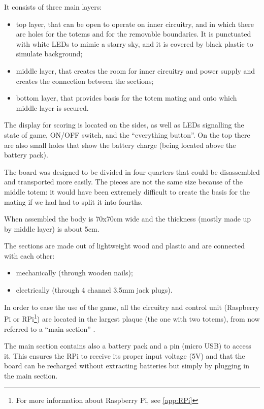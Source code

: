 \documentclass[a4paper,twoside]{book}
\begin{document}
\beforelist It consists of three main layers:
\begin{itemize}
\item top layer, that can be open to operate on inner circuitry, and in which there are holes for the totems and for the removable boundaries. It is punctuated with white LEDs to mimic a starry sky, and it is covered by black plastic to simulate background;
\item middle layer, that creates the room for inner circuitry and power supply and creates the connection between the sections;
\item bottom layer, that provides basis for the totem mating and onto which middle layer is secured.
\end{itemize}
\afterlist*
The display for scoring is located on the sides, as well as LEDs signalling the state of game, ON/OFF switch, and the \textquotedblleft{}everything button\textquotedblright{}. On the top there are also small holes that show the battery charge (being located above the battery pack).

The board was designed to be divided in four quarters that could be disassembled and transported more easily. The pieces are not the same size because of the middle totem: it would have been extremely difficult to create the basis for the  mating if we had had to split it into fourths.

When assembled the body is 70x70cm wide and the thickness (mostly made up by middle layer) is about 5cm.

\beforelist* The sections are made out of lightweight wood and plastic and are connected with each other:
\begin{itemize}
\item mechanically (through wooden nails);
\item electrically (through 4 channel 3.5mm jack plugs).
\end{itemize}
\afterlist*
In order to ease the use of the game, all the circuitry and control unit (Raspberry Pi or RPi\footnote{For more information about Raspberry Pi, see \autoref{app:RPi}}) are located in the largest plaque (the one with two totems), from now referred to a \textquotedblleft{}main section\textquotedblright{} .

The main section contains also a battery pack and a pin (micro USB) to access it. This ensures the RPi to receive its proper input voltage (5V) and that the board can be recharged without extracting batteries but simply by plugging in the main section.
\end{document}
